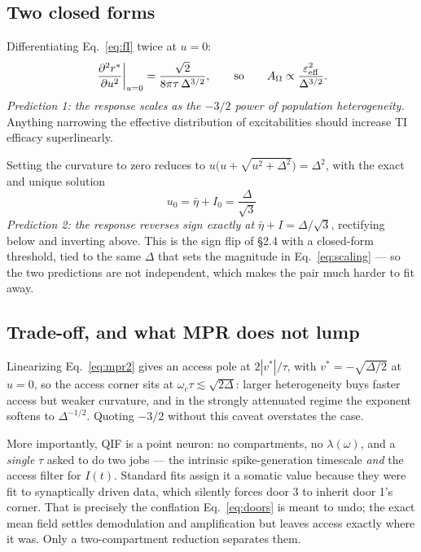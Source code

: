 \documentclass[11pt,a4paper]{article}
\newcommand{\Aom}{A_\Omega}
\begin{document}
\subsection{Two closed forms}
Differentiating Eq.~\eqref{eq:fI} twice at $u=0$:
\begin{equation}
\left.\frac{\partial^2 r^*}{\partial u^2}\right|_{u=0}=\frac{\sqrt2}{8\pi\tau\,\Delta^{3/2}},
\qquad\text{so}\qquad \Aom\propto\frac{\varepsilon_{\rm eff}^2}{\Delta^{3/2}} .
\label{eq:scaling}
\end{equation}
\emph{Prediction 1: the response scales as the $-3/2$ power of population heterogeneity.} Anything
narrowing the effective distribution of excitabilities should increase TI efficacy superlinearly.

Setting the curvature to zero reduces to $u\bigl(u+\sqrt{u^2+\Delta^2}\bigr)=\Delta^2$, with the exact
and unique solution
\begin{equation}
\boxed{\;u_0=\bar\eta+I_0=\frac{\Delta}{\sqrt3}\;}
\label{eq:flip}
\end{equation}
\emph{Prediction 2: the response reverses sign exactly at $\bar\eta+I=\Delta/\sqrt3$}, rectifying below
and inverting above. This is the sign flip of \S2.4 with a closed-form threshold, tied to the same
$\Delta$ that sets the magnitude in Eq.~\eqref{eq:scaling} --- so the two predictions are not
independent, which makes the pair much harder to fit away.

\subsection{Trade-off, and what MPR does not lump}
Linearizing Eq.~\eqref{eq:mpr2} gives an access pole at $2|v^*|/\tau$, with $v^*=-\sqrt{\Delta/2}$ at
$u=0$, so the access corner sits at $\omega_c\tau\lesssim\sqrt{2\Delta}$: larger heterogeneity buys
faster access but weaker curvature, and in the strongly attenuated regime the exponent softens to
$\Delta^{-1/2}$. Quoting $-3/2$ without this caveat overstates the case.

More importantly, QIF is a point neuron: no compartments, no $\lambda(\omega)$, and a \emph{single}
$\tau$ asked to do two jobs --- the intrinsic spike-generation timescale \emph{and} the access filter
for $I(t)$. Standard fits assign it a somatic value because they were fit to synaptically driven data,
which silently forces door 3 to inherit door 1's corner. That is precisely the conflation
Eq.~\eqref{eq:doors} is meant to undo; the exact mean field settles demodulation and amplification but
leaves access exactly where it was. Only a two-compartment reduction separates them.
\end{document}
